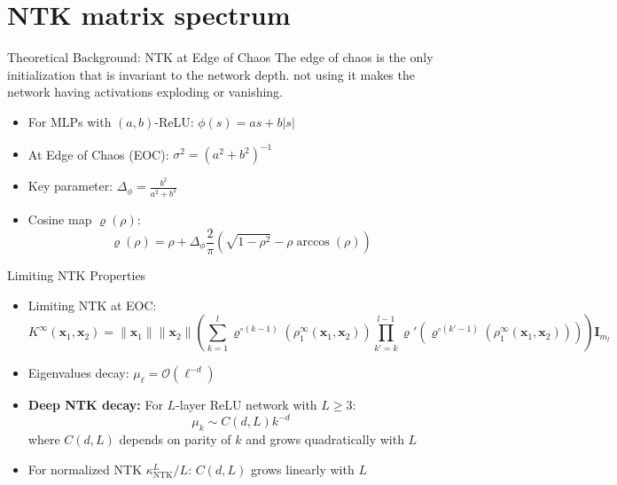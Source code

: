 \documentclass{beamer}
\begin{document}
\section{NTK matrix spectrum}

\begin{frame}{Theoretical Background: NTK at Edge of Chaos}
    The edge of chaos is the only initialization that is invariant to the network depth. not using it makes the network having 
    activations exploding or vanishing.
\begin{itemize}
\item For MLPs with $(a,b)$-ReLU: $\phi(s) = as + b|s|$
\item At Edge of Chaos (EOC): $\sigma^2 = (a^2+b^2)^{-1}$
\item Key parameter: $\Delta_\phi = \frac{b^2}{a^2+b^2}$
\item Cosine map $\varrho(\rho)$:
\[ \varrho(\rho) = \rho + \Delta_\phi \frac{2}{\pi}\left( \sqrt{1-\rho^2} - \rho \arccos(\rho) \right) \]
\end{itemize}
\end{frame}

\begin{frame}{Limiting NTK Properties}
\begin{itemize}
\item Limiting NTK at EOC:
\[ K^{\infty}(\mathbf{x}_1, \mathbf{x}_2) = \|\mathbf{x}_1\| \|\mathbf{x}_2\| \left( \sum_{k=1}^l \varrho^{\circ (k-1)}\left(\rho_1^{\infty}(\mathbf{x}_1, \mathbf{x}_2)\right) \prod_{k'=k}^{l-1} \varrho'\left(\varrho^{\circ (k'-1)}\left(\rho_1^{\infty}(\mathbf{x}_1, \mathbf{x}_2)\right)\right) \right) \mathbf{I}_{m_l} \]

\item Eigenvalues decay: $\mu_\ell = \mathcal{O}(\ell^{-d})$
\item \textbf{Deep NTK decay:} For $L$-layer ReLU network with $L \geq 3$:
\[ \mu_k \sim C(d, L)k^{-d} \]
where $C(d, L)$ depends on parity of $k$ and grows quadratically with $L$
\item For normalized NTK $\kappa^L_{\text{NTK}}/L$: $C(d, L)$ grows linearly with $L$
\end{itemize}
\end{frame}
\end{document}
